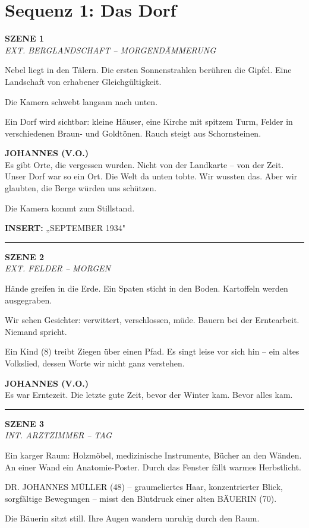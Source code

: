 \documentclass[11pt,a4paper,twoside]{book}
\newcommand{\szene}[2]{%
    \vspace{1em}
    \noindent\textbf{\textsf{#1}}\\
    \textit{#2}
    \vspace{0.5em}
}
\newcommand{\voiceover}[1]{%
    \begin{voiceoverbox}
    \textbf{JOHANNES (V.O.)}\\
    #1
    \end{voiceoverbox}
}
\begin{document}
\section*{Sequenz 1: Das Dorf}

\szene{SZENE 1}{EXT. BERGLANDSCHAFT -- MORGENDÄMMERUNG}

Nebel liegt in den Tälern. Die ersten Sonnenstrahlen berühren die Gipfel. Eine Landschaft von erhabener Gleichgültigkeit.

Die Kamera schwebt langsam nach unten.

Ein Dorf wird sichtbar: kleine Häuser, eine Kirche mit spitzem Turm, Felder in verschiedenen Braun- und Goldtönen. Rauch steigt aus Schornsteinen.

\voiceover{Es gibt Orte, die vergessen wurden. Nicht von der Landkarte -- von der Zeit. Unser Dorf war so ein Ort. Die Welt da unten tobte. Wir wussten das. Aber wir glaubten, die Berge würden uns schützen.}

Die Kamera kommt zum Stillstand.

\textbf{INSERT:} „SEPTEMBER 1934"

\vspace{1em}
\hrule
\vspace{1em}

\szene{SZENE 2}{EXT. FELDER -- MORGEN}

Hände greifen in die Erde. Ein Spaten sticht in den Boden. Kartoffeln werden ausgegraben.

Wir sehen Gesichter: verwittert, verschlossen, müde. Bauern bei der Erntearbeit. Niemand spricht.

Ein Kind (8) treibt Ziegen über einen Pfad. Es singt leise vor sich hin -- ein altes Volkslied, dessen Worte wir nicht ganz verstehen.

\voiceover{Es war Erntezeit. Die letzte gute Zeit, bevor der Winter kam. Bevor alles kam.}

\vspace{1em}
\hrule
\vspace{1em}

\szene{SZENE 3}{INT. ARZTZIMMER -- TAG}

Ein karger Raum: Holzmöbel, medizinische Instrumente, Bücher an den Wänden. An einer Wand ein Anatomie-Poster. Durch das Fenster fällt warmes Herbstlicht.

DR. JOHANNES MÜLLER (48) -- graumeliertes Haar, konzentrierter Blick, sorgfältige Bewegungen -- misst den Blutdruck einer alten BÄUERIN (70).

Die Bäuerin sitzt still. Ihre Augen wandern unruhig durch den Raum.
\end{document}
